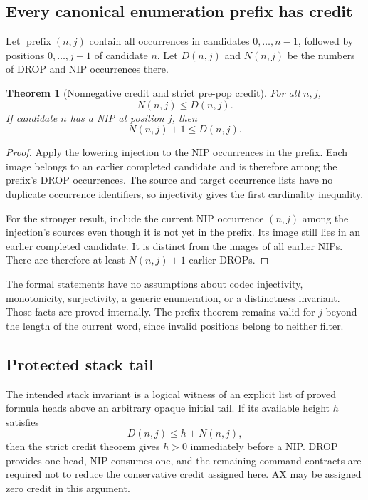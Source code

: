 \documentclass[11pt]{article}
\newtheorem{theorem}{Theorem}[section]
\theoremstyle{definition}\newtheorem{definition}[theorem]{Definition}
\begin{document}
\subsection{Every canonical enumeration prefix has credit}

Let $\operatorname{prefix}(n,j)$ contain all occurrences in candidates
$0,\ldots,n-1$, followed by positions $0,\ldots,j-1$ of candidate $n$.
Let $D(n,j)$ and $N(n,j)$ be the numbers of DROP and NIP occurrences there.

\begin{theorem}[Nonnegative credit and strict pre-pop credit]
For all $n,j$,
\[
 N(n,j)\le D(n,j).
\]
If candidate $n$ has a NIP at position $j$, then
\[
 N(n,j)+1\le D(n,j).
\]
\end{theorem}

\begin{proof}
Apply the lowering injection to the NIP occurrences in the prefix. Each image
belongs to an earlier completed candidate and is therefore among the prefix's
DROP occurrences. The source and target occurrence lists have no duplicate
occurrence identifiers, so injectivity gives the first cardinality inequality.

For the stronger result, include the current NIP occurrence $(n,j)$ among the
injection's sources even though it is not yet in the prefix. Its image still
lies in an earlier completed candidate. It is distinct from the images of all
earlier NIPs. There are therefore at least $N(n,j)+1$ earlier DROPs.
\end{proof}

The formal statements have no assumptions about codec injectivity, monotonicity,
surjectivity, a generic enumeration, or a distinctness invariant. Those facts
are proved internally. The prefix theorem remains valid for $j$ beyond the
length of the current word, since invalid positions belong to neither filter.

\subsection{Protected stack tail}

The intended stack invariant is a logical witness of an explicit list of
proved formula heads above an arbitrary opaque initial tail. If its available
height $h$ satisfies
\[
 D(n,j)\le h+N(n,j),
\]
then the strict credit theorem gives $h>0$ immediately before a NIP.
DROP provides one head, NIP consumes one, and the remaining command contracts
are required not to reduce the conservative credit assigned here. AX may be
assigned zero credit in this argument.
\end{document}
